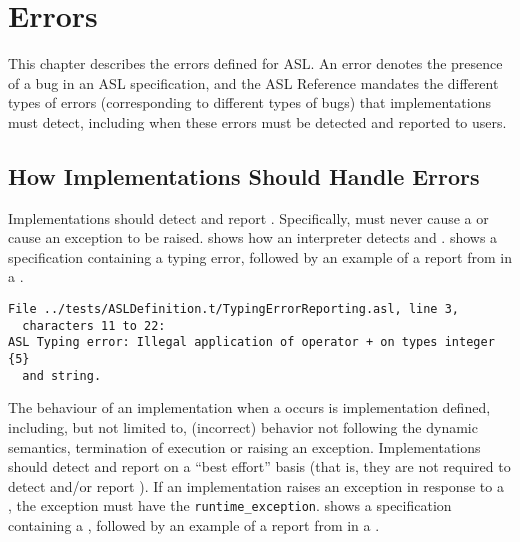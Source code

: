 \chapter{Errors\label{chap:Errors}}

This chapter describes the errors defined for ASL.
%
An error denotes the presence of a bug in an ASL specification,
and the ASL Reference mandates the different types of errors
(corresponding to different types of bugs) that implementations must detect,
including when these errors must be detected and reported to users.

\section{How Implementations Should Handle Errors}

 Implementations should detect and report \staticerrorsterm.
Specifically, \staticerrorsterm{} must never cause a \dynamicerrorterm{} or
cause an exception to be raised.
%
 shows how an interpreter detects \builderrorsterm{}
and \typingerrorsterm{}.
%
 shows a specification containing a typing error,
followed by an example of a report from \aslref{} in a \linuxbashshell.

\begin{Verbatim}[fontsize=\footnotesize, frame=single]
File ../tests/ASLDefinition.t/TypingErrorReporting.asl, line 3,
  characters 11 to 22:
ASL Typing error: Illegal application of operator + on types integer {5}
  and string.
\end{Verbatim}

 The behaviour of an implementation when a \dynamicerrorterm{}
occurs is implementation defined, including, but not limited to,
(incorrect) behavior not following the dynamic semantics, termination of execution or raising an exception.
%
Implementations should detect and report \dynamicerrorsterm{} on a ``best effort'' basis
(that is, they are not required to detect and/or report \dynamicerrorsterm{}).
%
If an implementation raises an exception in response to a \dynamicerrorterm{},
the exception must have the \supertypeterm{}
\verb|runtime_exception|.
%
 shows a specification containing a \dynamicerrorterm{},
followed by an example of a report from \aslref{} in a \linuxbashshell.


